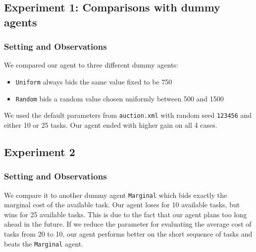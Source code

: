 \documentclass[11pt]{article}
\begin{document}
\subsection{Experiment 1: Comparisons with dummy agents}

\subsubsection{Setting and Observations}
We compared our agent to three different dummy agents:
\begin{itemize}
\item \verb|Uniform| always bids the same value fixed to be 750
\item \verb|Random| bids a random value chosen uniformly between 500 and 1500
\end{itemize}
We used the default parameters from \verb|auction.xml| with random seed \verb|123456| and either 10 or 25 tasks. Our agent ended with higher gain on all 4 cases. 

\subsection{Experiment 2}

\subsubsection{Setting and Observations}

We compare it to another dummy agent \verb|Marginal| which bids exactly the marginal cost of the available task. Our agent loses for 10 available tasks, but wins for 25 available tasks. This is due to the fact that our agent plans too long ahead in the future. If we reduce the parameter for evaluating the average cost of tasks from 20 to 10, our agent performs better on the short sequence of tasks and beats the \verb|Marginal| agent.  
\end{document}
